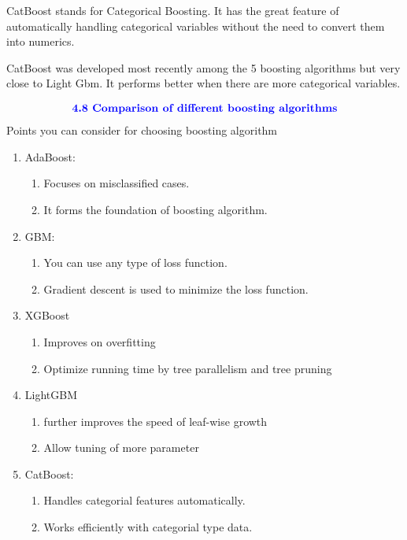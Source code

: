 \documentclass{homework}
\begin{document}
 CatBoost stands for Categorical Boosting. It has the great feature of automatically handling categorical variables without the need to convert them into numerics.

CatBoost was developed most recently among the 5 boosting algorithms but very close to Light Gbm. It performs better when there are more categorical variables.

\begin{align*}
    \textcolor{blue}{ \text{{\textbf{4.8 Comparison of different boosting algorithms}}}}
 \end{align*}
 Points you can consider for choosing boosting algorithm
\begin{enumerate}
    \item AdaBoost:
        \begin{enumerate}
            \item Focuses on misclassified cases.
            \item It forms the foundation of boosting algorithm.
        \end{enumerate}
    \item GBM:
        \begin{enumerate}
            \item You can use any type of loss function.
            \item Gradient descent is used to minimize the loss function.
        \end{enumerate}
    \item XGBoost
        \begin{enumerate}
            \item Improves on overfitting 
            \item Optimize running time by tree parallelism and tree pruning
        \end{enumerate}
    \item LightGBM
        \begin{enumerate}
            \item further improves the speed of leaf-wise growth
            \item Allow tuning of more parameter
        \end{enumerate}
    \item CatBoost:
        \begin{enumerate}
            \item Handles categorial features automatically.
            \item Works efficiently with categorial type data.
        \end{enumerate}
\end{enumerate}
\end{document}
